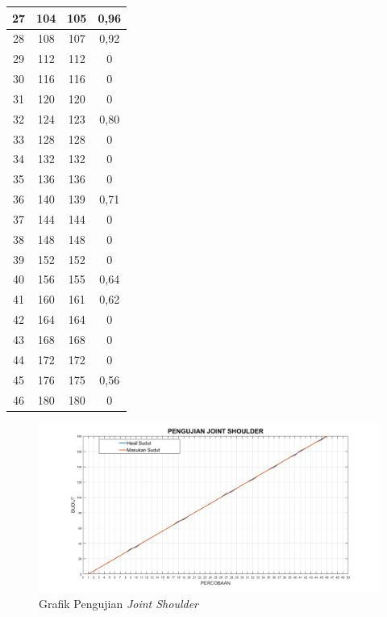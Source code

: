 \begin{longtable}{|c|c|c|c|}
	27 & 104     & 105      & 0,96 \\ \hline
	28 & 108     & 107      & 0,92 \\ \hline
	29 & 112     & 112      & 0           \\ \hline
	30 & 116     & 116      & 0           \\ \hline
	31 & 120     & 120      & 0           \\ \hline
	32 & 124     & 123      & 0,80 \\ \hline
	33 & 128     & 128      & 0           \\ \hline
	34 & 132     & 132      & 0           \\ \hline
	35 & 136     & 136      & 0           \\ \hline
	36 & 140     & 139      & 0,71 \\ \hline
	37 & 144     & 144      & 0           \\ \hline
	38 & 148     & 148      & 0           \\ \hline
	39 & 152     & 152      & 0           \\ \hline
	40 & 156     & 155      & 0,64 \\ \hline
	41 & 160     & 161      & 0,62       \\ \hline
	42 & 164     & 164      & 0           \\ \hline
	43 & 168     & 168      & 0           \\ \hline
	44 & 172     & 172      & 0           \\ \hline
	45 & 176     & 175      & 0,56 \\ \hline
	46 & 180     & 180      & 0           \\ \hline
\end{longtable}
\fontsize{12}{15}\selectfont
\begin{figure}[H]
	\centering
	\includegraphics[width=13cm]{gambar/ps.png}
	\caption{Grafik Pengujian \textit{Joint Shoulder}}
	\label{pic.jointshoulder}
\end{figure}

